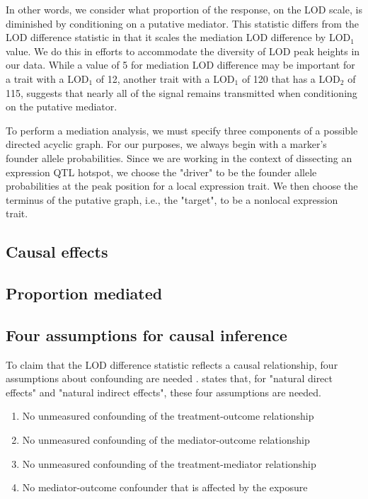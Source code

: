 \documentclass{article}
\begin{document}
In other words, we consider what proportion of the response, on the LOD scale, is diminished by conditioning on a putative mediator. This statistic differs from the LOD difference statistic in that it scales the mediation LOD difference by LOD$_1$ value. We do this in efforts to accommodate the diversity of LOD peak heights in our data. While a value of 5 for mediation LOD difference may be important for a trait with a LOD$_1$ of 12, another trait with a LOD$_1$ of 120 that has a LOD$_2$ of 115, suggests that nearly all of the signal remains transmitted when conditioning on the putative mediator.

To perform a mediation analysis, we must specify three components of a possible directed acyclic graph. For our purposes, we always begin with a marker's founder allele probabilities. Since we are working in the context of dissecting an expression QTL hotspot, we choose the "driver" to be the founder allele probabilities at the peak position for a local expression trait. We then choose the terminus of the putative graph, i.e., the "target", to be a nonlocal expression trait. 



\subsection{Causal effects}


\subsection{Proportion mediated}



\subsection{Four assumptions for causal inference}

To claim that the LOD difference statistic reflects a causal relationship, four assumptions about confounding are needed \citep{vanderweele2015explanation}. \citet{vanderweele2015explanation} states that, for "natural direct effects" and "natural indirect effects", these four assumptions are needed.

\begin{enumerate}
\item No unmeasured confounding of the treatment-outcome relationship
\item No unmeasured confounding of the mediator-outcome relationship
\item No unmeasured confounding of the treatment-mediator relationship
\item No mediator-outcome confounder that is affected by the exposure
\end{enumerate}
\end{document}
